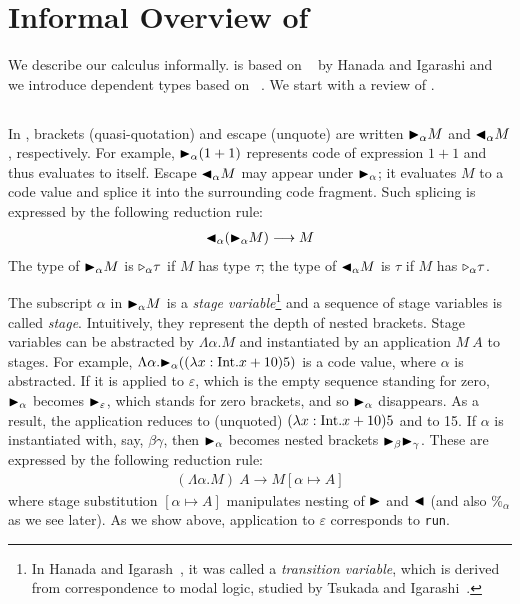 
\section{Informal Overview of \LMD \label{sec:informal-overview}}

We describe our calculus \LMD informally.  \LMD is based on
\LTP~\cite{Hanada2014} by Hanada and Igarashi and we introduce
dependent types based on \LLF~\cite{attapl}.  We start with a review of 
\LTP.

\subsection{\LTP}


In \LTP, brackets (quasi-quotation) and escape (unquote) are written
${\mathop{\blacktriangleright}}_\alpha M$ and ${\mathop{\blacktriangleleft}}_\alpha M$, respectively.  For example,
${\mathop{\blacktriangleright}}_\alpha (1 + 1)$ represents code of expression $1 + 1$ and thus
evaluates to itself.  Escape ${\mathop{\blacktriangleleft}}_\alpha M$ may appear under
${\mathop{\blacktriangleright}}_\alpha$; it evaluates $M$ to a code value and splice it into the
surrounding code fragment.  Such splicing is expressed by the
following reduction rule:
\begin{align*}
	{\mathop{\blacktriangleleft}}_\alpha ({\mathop{\blacktriangleright}}_\alpha M) \longrightarrow M 
\end{align*}
The type of
${\mathop{\blacktriangleright}}_\alpha M$ is ${\mathop{\triangleright}}_\alpha \tau$ if $M$ has type $\tau$; the type
of ${\mathop{\blacktriangleleft}}_\alpha M$ is $\tau$ if $M$ has ${\mathop{\triangleright}}_\alpha \tau$.

The subscript $\alpha$ in ${\mathop{\blacktriangleright}}_\alpha M$ is a \textit{stage variable}\footnote{%
  In Hanada and Igarash~\cite{Hanada2014}, it was called a \textit{transition variable}, which is derived from correspondence to modal logic, studied by Tsukada and Igarashi~\cite{Tsukada}.} and
a sequence of stage variables is called \textit{stage}.
Intuitively, they represent the depth of nested brackets.
Stage variables can be abstracted by $\Lambda\alpha.M$ and instantiated by
an application $M\ A$ to stages.
For example, $\Lambda\alpha.{\mathop{\blacktriangleright}}_\alpha ((\lambda x:\textrm{Int}.x+10) 5)$ is a code value, where \(\alpha\)
is abstracted.  If it is applied to \(\varepsilon\), which is the empty sequence standing for zero,
\({\mathop{\blacktriangleright}}_\alpha\) becomes \({\mathop{\blacktriangleright}}_\varepsilon\), which stands for zero brackets,
and so \({\mathop{\blacktriangleright}}_\alpha\) disappears.  As a result, the application reduces to (unquoted) \((\lambda x:\textrm{Int}.x+10) 5\) and to 15.  If \(\alpha\) is instantiated with, say, \(\beta\gamma\), then
\({\mathop{\blacktriangleright}}_\alpha\) becomes nested brackets \({\mathop{\blacktriangleright}}_{\beta} {\mathop{\blacktriangleright}}_\gamma\).  These are expressed by
the following reduction rule:
\begin{align*}
	(\Lambda\alpha.M)\ A \longrightarrow M[\alpha\mapsto A]
\end{align*}
where stage substitution \([\alpha \mapsto A]\) manipulates nesting of
\({\mathop{\blacktriangleright}}\) and \({\mathop{\blacktriangleleft}}\) (and also \(\%_\alpha\) as we see later).  As we
show above, application to $\varepsilon$ corresponds to \texttt{run}.

